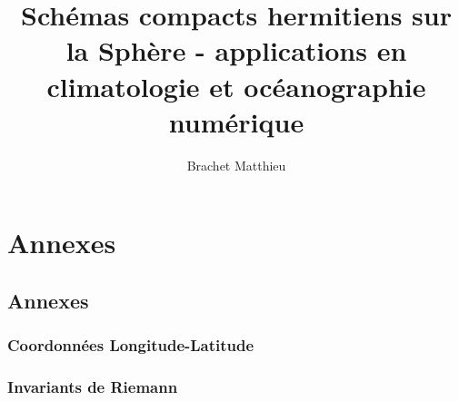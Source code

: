 \documentclass[10pt,a4paper]{book}
\author{Brachet Matthieu}
\title{Schémas compacts hermitiens sur la Sphère - applications en climatologie et océanographie numérique}
\begin{document}
\maketitle
\tableofcontents
\listoffigures
\listoftables
\newpage
%
%




 



\part{Annexes}
\chapter{Annexes}
\section{Coordonnées Longitude-Latitude}

\section{Invariants de Riemann}




\end{document}
